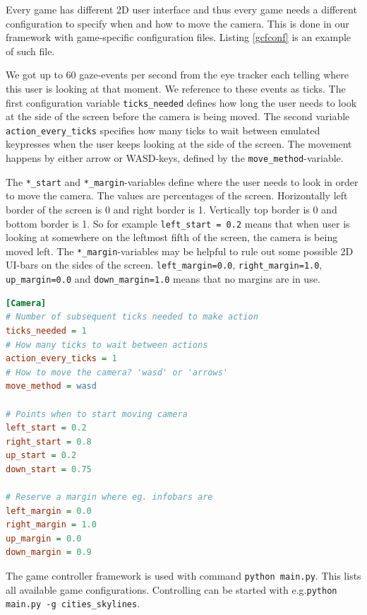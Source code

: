 \documentclass[english]{tktltiki}
\begin{document}
Every game has different 2D user interface and thus every game needs a different configuration to specify when and how to move the camera. This is done in our framework with game-specific configuration files. Listing \ref{gcfconf} is an example of such file.

We got up to 60 gaze-events per second from the eye tracker each telling where this user is looking at that moment. We reference to these events as ticks. The first configuration variable \verb|ticks_needed| defines how long the user needs to look at the side of the screen before the camera is being moved. The second variable \verb|action_every_ticks| specifies how many ticks to wait between emulated keypresses when the user keeps looking at the side of the screen. The movement happens by either arrow or WASD-keys, defined by the \verb|move_method|-variable.

The \verb|*_start| and \verb|*_margin|-variables define where the user needs to look in order to move the camera. The values are percentages of the screen. Horizontally left border of the screen is 0 and right border is 1. Vertically top border is 0 and bottom border is 1. So for example \verb|left_start = 0.2| means that when user is looking at somewhere on the leftmost fifth of the screen, the camera is being moved left. The \verb|*_margin|-variables may be helpful to rule out some possible 2D UI-bars on the sides of the screen. \verb|left_margin=0.0|, \verb|right_margin=1.0|, \verb|up_margin=0.0| and \verb|down_margin=1.0| means that no margins are in use.

\bigskip
\begin{lstlisting}[language={Ini},caption={Example of game-specific configuration file},label={gcfconf}]
[Camera]
# Number of subsequent ticks needed to make action
ticks_needed = 1
# How many ticks to wait between actions
action_every_ticks = 1
# How to move the camera? 'wasd' or 'arrows'
move_method = wasd

# Points when to start moving camera
left_start = 0.2
right_start = 0.8
up_start = 0.2
down_start = 0.75

# Reserve a margin where eg. infobars are
left_margin = 0.0
right_margin = 1.0
up_margin = 0.0
down_margin = 0.9
\end{lstlisting}
\bigskip

The game controller framework is used with command \verb|python main.py|. This lists all available game configurations. Controlling can be started with e.g.\newline \verb|python main.py -g cities_skylines|.
\end{document}
